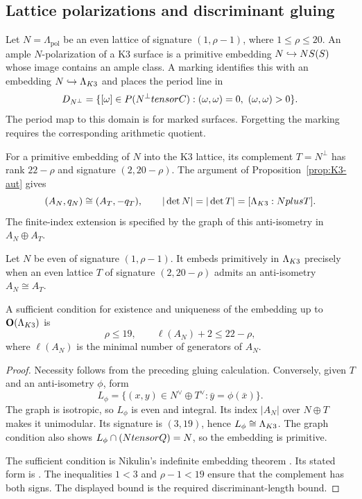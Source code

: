 \subsection{Lattice polarizations and discriminant gluing}
\label{app:lattice-Lambda-S}

\begin{definition}
\label{def:lattice-polarization}
Let $N=\Lambda_{\mathrm{pol}}$ be an even lattice of signature
$(1,\rho-1)$, where $1\leq\rho\leq20$.  An ample $N$-polarization
of a K3 surface is a primitive embedding $N\hookrightarrow NS(S)$
whose image contains an ample class.  A marking identifies this with
an embedding $N\hookrightarrow\Lambda_{K3}$ and places the period line
in
\[
D_{N^\perp}
=\{[\omega]\in P(N^\perp tensorC):
(\omega,\omega)=0,\ (\omega,\omega)>0\}.
\]
The period map to this domain is for marked surfaces.  Forgetting
the marking requires the corresponding arithmetic quotient.
\end{definition}

\begin{verification}
\label{ver:lambda-S-invariants}
For a primitive embedding of $N$ into the K3 lattice, its complement
$T=N^\perp$ has rank $22-\rho$ and signature $(2,20-\rho)$.  The
argument of Proposition~\ref{prop:K3-aut} gives
\[
(A_N,q_N)\cong(A_T,-q_T),\qquad
|\det N|=|\det T|=[\Lambda_{K3}:Nplus T].
\]
The finite-index extension is specified by the graph of this
anti-isometry in $A_N\oplus A_T$.
\end{verification}

\begin{proposition}
\label{prop:nikulin-embedding}
Let $N$ be even of signature $(1,\rho-1)$.
It embeds primitively in $\Lambda_{K3}$ precisely when an even lattice
$T$ of signature $(2,20-\rho)$ admits an anti-isometry $A_N\cong A_T$.

A sufficient condition for existence and uniqueness of the embedding
up to $\mathbf{O}(\Lambda_{K3})$ is
\[
\rho\leq19,\qquad \ell(A_N)+2\leq22-\rho,
\]
where $\ell(A_N)$ is the minimal number of generators of $A_N$.
\end{proposition}

\begin{proof}
Necessity follows from the preceding gluing calculation.  Conversely,
given $T$ and an anti-isometry $\phi$, form
\[
L_\phi=\{(x,y)\in N^\vee\oplus T^\vee:
\bar y=\phi(\bar x)\}.
\]
The graph is isotropic, so $L_\phi$ is even and integral.  Its index
$|A_N|$ over $N\oplus T$ makes it unimodular.  Its signature is
$(3,19)$, hence $L_\phi\cong\Lambda_{K3}$.  The graph condition also
shows $L_\phi\cap(NtensorQ)=N$, so the embedding is primitive.

The sufficient condition is Nikulin's indefinite embedding theorem
\cite[Theorem~1.14.4]{Nikulin1980}.  Its stated form is
\cite[Chapter~14, Theorem~1.12]{HuybrechtsK3}.  The inequalities
$1<3$ and $\rho-1<19$ ensure that the complement has both signs.
The displayed bound is the required discriminant-length bound.
\end{proof}

